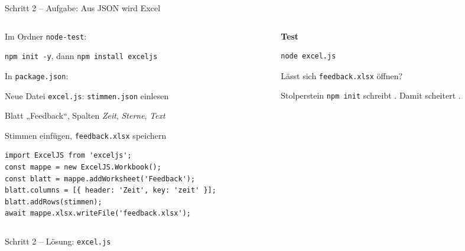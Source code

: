 \begin{frame}[fragile]{Schritt 2 -- Aufgabe: Aus JSON wird Excel}
  \footnotesize
  \begin{columns}[onlytextwidth,t]
    \begin{column}{0.57\textwidth}
      Im Ordner \texttt{node-test}:
      \begin{tugenumerate}
        \item \texttt{npm init -y}, dann \texttt{npm install exceljs}
        \item In \texttt{package.json}: 
        \item Neue Datei \texttt{excel.js}: \texttt{stimmen.json} einlesen
        \item Blatt „Feedback“, Spalten \emph{Zeit}, \emph{Sterne}, \emph{Text}
        \item Stimmen einfügen, \texttt{feedback.xlsx} speichern
      \end{tugenumerate}
\begin{lstlisting}[style=jssm,numbers=none]
import ExcelJS from 'exceljs';
const mappe = new ExcelJS.Workbook();
const blatt = mappe.addWorksheet('Feedback');
blatt.columns = [{ header: 'Zeit', key: 'zeit' }];
blatt.addRows(stimmen);
await mappe.xlsx.writeFile('feedback.xlsx');
\end{lstlisting}
    \end{column}
    \begin{column}{0.39\textwidth}
      \textbf{Test}
\begin{lstlisting}[style=term]
node excel.js
\end{lstlisting}
      Lässt sich \texttt{feedback.xlsx} öffnen?
      \begin{alertblock}{Stolperstein}
        \footnotesize \texttt{npm init} schreibt . Damit scheitert
        .
      \end{alertblock}
    \end{column}
  \end{columns}
\end{frame}

\begin{loesung}
\begin{frame}[fragile]{Schritt 2 -- Lösung: \texttt{excel.js}}
\end{frame}
\end{loesung}


